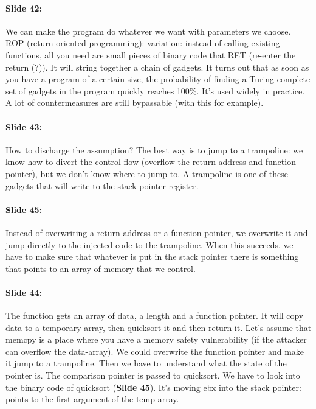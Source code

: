 \documentclass[10pt,a4paper]{report}
\begin{document}
\paragraph{Slide 42:} We can make the program do whatever we want with parameters we choose.\\
ROP (return-oriented programming): variation: instead of calling existing functions, all you need are small pieces of binary code that RET (re-enter the return (?)). It will string together a chain of gadgets. It turns out that as soon as you have a program of a certain size, the probability of finding a  Turing-complete set of gadgets in the program quickly reaches 100\%. It's used widely in practice. A lot of countermeasures are still bypassable (with this for example).

\paragraph{Slide 43:} How to discharge the assumption? The best way is to jump to a trampoline: we know how to divert the control flow (overflow the return address and function pointer), but we don't know where to jump to. A trampoline is one of these gadgets that will write to the stack pointer register.

\paragraph{Slide 45:} Instead of overwriting a return address or a function pointer, we overwrite it and jump directly to the injected code to the trampoline. When this succeeds, we have to make sure that whatever is put in the stack pointer there is something that points to an array of memory that we control.

\paragraph{Slide 44:} The function gets an array of data, a length and a function pointer. It will copy data to a temporary array, then quicksort it and then return it. Let's assume that memcpy is a place where you have a memory safety vulnerability (if the attacker can overflow the data-array). We could overwrite the function pointer and make it jump to a trampoline. Then we have to understand what the state of the pointer is. The comparison pointer is passed to quicksort. We have to look into the binary code of quicksort (\textbf{Slide 45}). It's moving ebx into the stack pointer: points to the first argument of the temp array. 
\end{document}
